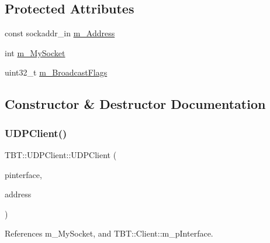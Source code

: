 \subsection*{Protected Attributes}
\begin{DoxyCompactItemize}
\item 
const sockaddr\+\_\+in \hyperlink{classTBT_1_1UDPClient_a880ede9d0208905a251bbfd221646e3b_a880ede9d0208905a251bbfd221646e3b}{m\+\_\+\+Address}
\item 
int \hyperlink{classTBT_1_1UDPClient_aef66ad83fa20b995152c6f41cb8ba91f_aef66ad83fa20b995152c6f41cb8ba91f}{m\+\_\+\+My\+Socket}
\item 
uint32\+\_\+t \hyperlink{classTBT_1_1UDPClient_a91eb8f34a9606428eba7230c2bfdb6f6_a91eb8f34a9606428eba7230c2bfdb6f6}{m\+\_\+\+Broadcast\+Flags}
\end{DoxyCompactItemize}


\subsection{Constructor \& Destructor Documentation}
\mbox{\label{classTBT_1_1UDPClient_a7b6f7858b9d3a7243bdd48fbf150b9f8_a7b6f7858b9d3a7243bdd48fbf150b9f8}} 
\subsubsection{\texorpdfstring{U\+D\+P\+Client()}{UDPClient()}}
{\footnotesize\ttfamily T\+B\+T\+::\+U\+D\+P\+Client\+::\+U\+D\+P\+Client (\begin{DoxyParamCaption}\item[{\hyperlink{classTBT_1_1UDPClientInterface}{U\+D\+P\+Client\+Interface} $\ast$}]{pinterface,  }\item[{const sockaddr\+\_\+in \&}]{address }\end{DoxyParamCaption})}



References m\+\_\+\+My\+Socket, and T\+B\+T\+::\+Client\+::m\+\_\+p\+Interface.

\mbox{\label{classTBT_1_1UDPClient_a65ed6ba0adf48e065e99b31c7d8aec26_a65ed6ba0adf48e065e99b31c7d8aec26}} 
